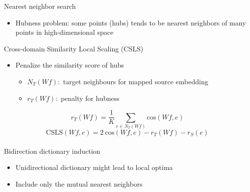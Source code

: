 \documentclass[11pt, a4paper, landscape]{article}
\begin{document}
\NewPage
{}
\vfill
\noindent Nearest neighbor search
\begin{itemize}
	\item Hubness problem: some points (hubs) tends to be nearest neighbors of many points in high-dimensional space\\
\end{itemize}
Cross-domain Similarity Local Scaling (CSLS)
\begin{itemize}
	
	\item Penalize the similarity score of hubs
	\begin{itemize}
		\item $N_T(Wf):$ target neighbours for mapped source embedding
		\item $r_T(W f):$ penalty for hubness
	\end{itemize}
\end{itemize}
\[r_T(W f) = \frac{1}{K} \sum_{e \in N_T(Wf)}\textrm{cos}(Wf, e) \]
\[ \textrm{CSLS}(Wf, e) = 2\ \textrm{cos}(Wf, e)-r_{T}(Wf)-r_{S}(e)\]\\
Bidirection dictionary induction
\begin{itemize}
	\item Unidirectional dictionary might lead to local optima
	\item Include only the mutual nearest neighbors 
\end{itemize}
\vfill	
	

	\FinalPage
	

	
	
	\NewPage
	
	
	
\end{document}
